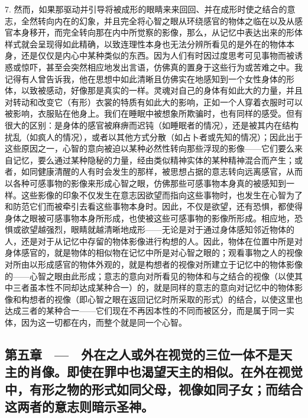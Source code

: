 7. 然而，如果那驱动并引导将被成形的眼睛来来回回、并在成形时使之结合的意志，全然转向内在的幻象，并且完全将心智之眼从环绕感官的物体之临在以及从感官本身移开，而完全转向那在内中所觉察的影像，那么，从记忆中表达出来的形体样式就会呈现得如此精确，以致连理性本身也无法分辨所看见的是外在的物体本身，还是仅仅是内心中某种类似的东西。因为人们有时因过度思考可见事物而被诱惑或惊吓，甚至会突然相应地发出言语，仿佛真的置身于这些行为或苦难之中。我记得有人曾告诉我，他在思想中如此清晰且仿佛实在地感知到一个女性身体的形体，以致被感动，好像那是真实的一样。灵魂对自己的身体有如此大的力量，并且对转动和改变它（有形）衣裳的特质有如此大的影响，正如一个人穿着衣服时可以被影响，衣服贴在他身上。我们在睡眠中被想象所欺骗时，也有同样的感受。但有很大的区别：是身体的感官被麻痹而迟钝（如睡眠者的情况），还是被其内在结构扰乱（如疯人的情况），或者以其他方式分散（如占卜者或先知的情况）；因此出于这些原因之一，心智的意向被迫以某种必然性转向那些浮现的影像——它们要么来自记忆，要么通过某种隐秘的力量，经由类似精神实体的某种精神混合而产生；或者，如同健康清醒的人有时会发生的那样，被思想占据的意志转向远离感官，从而以各种可感事物的影像来形成心智之眼，仿佛那些可感事物本身真的被感知到一样。这些影像的印象不仅发生在意志因欲望而指向这些事物时，也发生在心智为了和防范它们而被牵引去看这些事物本身时。因此，不仅是欲望，还有恐惧，都使得身体之眼被可感事物本身所形成，也使被这些可感事物的影像所形成。相应地，恐惧或欲望越强烈，眼睛就越清晰地成形——无论是对于通过身体感知邻近物体的人，还是对于从记忆中存留的物体影像进行构想的人。因此，物体在位置中所是对身体感官的，就是物体的相似物在记忆中所是对心智之眼的；观看事物之人的视像对所由以形成感官的物体外观的，就是构想者的视像对所建立于记忆中的物体影像的——心智之眼由此形成；意志的意向对所看见的物体和与之结合的视像（以使其中三者虽本性不同却达成某种合一）的，就是同样的意志的意向对记忆中的物体影像和构想者的视像（即心智之眼在返回记忆时所采取的形式）的结合，以使这里也达成三者的某种合一——它们现在不再因本性的不同而被区分，而是属于同一实体，因为这一切都在内，而整个就是同一个心智。\par


\subsection{第五章　—　外在之人或外在视觉的三位一体不是天主的肖像。即使在罪中也渴望天主的相似。在外在视觉中，有形之物的形式如同父母，视像如同子女；而结合这两者的意志则暗示圣神。}

